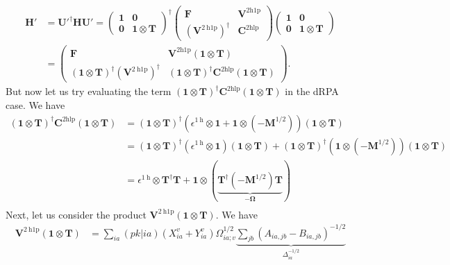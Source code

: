 \begin{align}
    \bm{H'} &= \bm{U'}^\dag \bm{H} \bm{U'} = \begin{pmatrix} \bm{1} & \bm{0}\\ \bm{0}&\bm{1}\otimes\bm{T } \end{pmatrix}^\dag \begin{pmatrix} \bm{F} & \bm{V}^{2 \mathrm{h1p}}\\ \left(\bm{V}^{2 \mathrm{~h} 1 \mathrm{p}}\right)^{\dagger} & \bm{C}^{2 \mathrm{hlp}} \end{pmatrix} \begin{pmatrix} \bm{1} & \bm{0} \\ \bm{0}&\bm{1}\otimes\bm{T } \end{pmatrix}\\
& = \begin{pmatrix} \bm{F} & \bm{V}^{2 \mathrm{h1p}}\left(\bm{1}\otimes\bm{T}\right)\\ \left(\bm{1}\otimes\bm{T}\right)^\dag \left(\bm{V}^{2 \mathrm{~h} 1 \mathrm{p}}\right)^{\dagger} & \left(\bm{1}\otimes\bm{T}\right)^\dagger \bm{C}^{2 \mathrm{hlp}} \left(\bm{1}\otimes\bm{T}\right) \end{pmatrix}.
\label{eq:tim_upfolded_hamiltonian}
\end{align}
But now let us try evaluating the term $\left(\bm{1}\otimes\bm{T}\right)^\dagger \bm{C}^{2 \mathrm{hlp}} \left(\bm{1}\otimes\bm{T}\right)$ in the dRPA case. We have
\begin{align}
    \left(\bm{1}\otimes\bm{T}\right)^\dagger \bm{C}^{2 \mathrm{hlp}} \left(\bm{1}\otimes\bm{T}\right) &= \left(\bm{1}\otimes\bm{T}\right)^\dagger \left(\epsilon^{1 \mathrm{~h}} \otimes \bm{1} + \bm{1} \otimes (-\bm{M}^{1/2})\right) \left(\bm{1}\otimes\bm{T}\right) \\
&= \left(\bm{1}\otimes\bm{T}\right)^\dagger \left(\epsilon^{1 \mathrm{~h}} \otimes \bm{1}\right) \left(\bm{1}\otimes\bm{T}\right) + \left(\bm{1}\otimes\bm{T}\right)^\dagger \left(\bm{1} \otimes (-\bm{M}^{1/2})\right) \left(\bm{1}\otimes\bm{T}\right) \\
&= \epsilon^{1 \mathrm{~h}} \otimes\bm{T}^\dagger\bm{T} + \bm{1} \otimes \left(\underbrace{\bm{T}^\dagger (-\bm{M}^{1/2}) \bm{T}}_{-\bm{\Omega }}\right) \\
\end{align}
Next, let us consider the product $\bm{V}^{2 \mathrm{~h} 1 \mathrm{p}} \left(\bm{1}\otimes\bm{T}\right) $. We have
\begin{align}
    \bm{V}^{2 \mathrm{~h} 1 \mathrm{p}} \left(\bm{1}\otimes\bm{T}\right) &= \sum_{ia} (pk|ia) \left( X_{ia}^{v} + Y_{ia}^{v} \right) \Omega_{ia;v}^{1/2} \underbrace{\sum_{jb} \left(A_{ia,jb} - B_{ia,jb}\right)^{-1/2}}_{\Delta _{ia}^{-1/2}} \\
\end{align}
